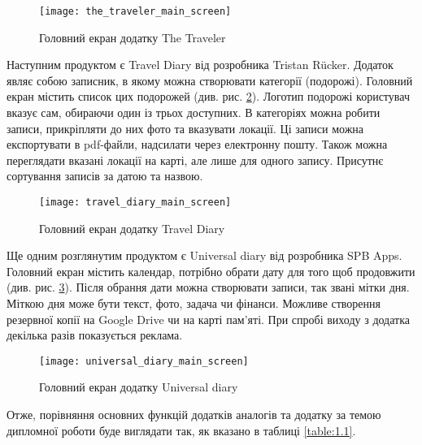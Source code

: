 \documentclass[../main.tex]{subfiles}
\begin{document}
{\begin{figure}[H]
	\centering
	\texttt{[image: the\_traveler\_main\_screen]}
	\caption{Головний екран додатку The Traveler}
	\label{figure:1.2}
\end{figure}

Наступним продуктом є Travel Diary від розробника Tristan Rücker. Додаток являє собою записник, в якому можна створювати категорії (подорожі). Головний екран містить список цих подорожей (див. рис. \ref{figure:1.3}). Логотип подорожі користувач вказує сам, обираючи один із трьох доступних. В категоріях можна робити записи, прикріпляти до них фото та вказувати локації. Ці записи можна експортувати в pdf-файли, надсилати через електронну пошту. Також можна переглядати вказані локації на карті, але лише для одного запису. Присутнє сортування записів за датою та назвою.

\begin{figure}[H]
\centering
\texttt{[image: travel\_diary\_main\_screen]}
\caption{Головний екран додатку Travel Diary}
\label{figure:1.3}
\end{figure}

Ще одним розглянутим продуктом є Universal diary від розробника SPB Apps. Головний екран містить календар, потрібно обрати дату для того щоб продовжити (див. рис. \ref{figure:1.4}). Після обрання дати можна створювати записи, так звані мітки дня. Міткою дня може бути текст, фото, задача чи фінанси. Можливе створення резервної копії на Google Drive чи на карті пам'яті. При спробі виходу з додатка декілька разів показується реклама.

\begin{figure}[H]
\centering
\texttt{[image: universal\_diary\_main\_screen]}
\caption{Головний екран додатку Universal diary}
\label{figure:1.4}
\end{figure}

Отже, порівняння основних функцій додатків аналогів та додатку за темою дипломної роботи буде виглядати так, як вказано в таблиці \ref{table:1.1}.

}
\end{document}
